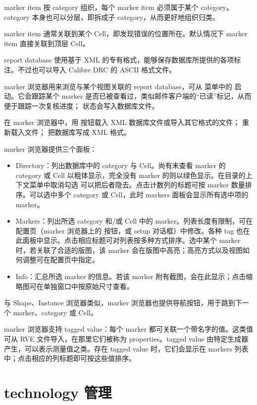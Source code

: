 marker item 按 category 组织，每个 marker item 必须属于某个 category。category 本身也可以分层，即拆成子 category，从而更好地组织归类。

marker item 通常关联到某个 Cell，即发现错误的位置所在。默认情况下 marker item 直接关联到顶层 Cell。

report database 使用基于 XML 的专有格式，能够保存数据库所提供的各项标注。不过也可以导入 Calibre DRC 的 ASCII 格式文件。

marker 浏览器用来浏览与某个视图关联的 report database，可从  菜单中的  启动。它会跟踪某个 marker 是否已被查看过，类似邮件客户端的“已读”标记，从而便于跟踪一次复核进度； 状态会写入数据库文件。

在 marker 浏览器中，用  按钮载入 XML 数据库文件或导入其它格式的文件； 重新载入文件； 把数据库写成 XML 格式。

marker 浏览器提供三个面板：

\begin{itemize}
\item Directory：列出数据库中的 category 与 Cell。尚有未查看 marker 的 category 或 Cell 以粗体显示，完全没有 marker 的则以绿色显示。在目录的上下文菜单中取消勾选  可以把后者隐去。点击计数列的标题可按 marker 数量排序。可以选中多个 category 或 Cell，此时 markers 面板会显示所有选中项的 marker。
\item Markers：列出所选 category 和/或 Cell 中的 marker。列表长度有限制，可在配置页（marker 浏览器上的  按钮，或 setup 对话框）中修改。各种 tag 也在此面板中显示。点击相应标题可对列表按多种方式排序。选中某个 marker 时，若关联了合适的版图，该 marker 会在版图中高亮；高亮方式以及视图如何调整可在配置页中指定。
\item Info：汇总所选 marker 的信息。若该 marker 附有截图，会在此显示；点击缩略图可在单独窗口中按原始尺寸查看。
\end{itemize}

与 Shape、Instance 浏览器类似，marker 浏览器也提供导航按钮，用于跳到下一个 marker、category 或 Cell。

marker 浏览器支持 tagged value：每个 marker 都可关联一个带名字的值。这类值可从 RVE 文件导入，在那里它们被称为 properties。tagged value 由特定生成器产生，可以表示测量值之类。存在 tagged value 时，它们会显示在 markers 列表中；点击相应的列标题即可按这些值排序。

\section{technology 管理}\label{sec:technology_manager}


